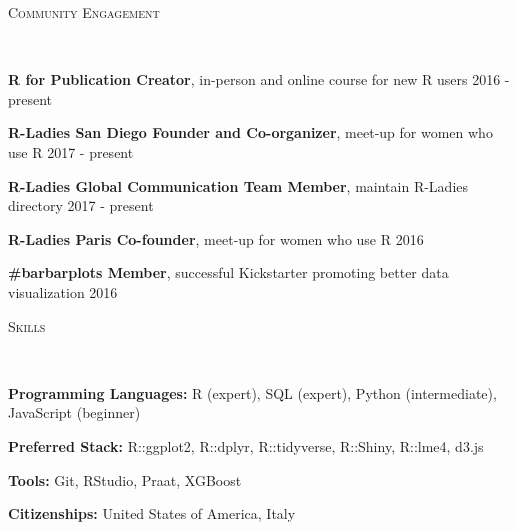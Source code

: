 \documentclass[9pt]{article}
\newenvironment{changemargin}[2]{%
  \begin{list}{}{%
    \setlength{\topsep}{0pt}%
    \setlength{\leftmargin}{#1}%
    \setlength{\rightmargin}{#2}%
    \setlength{\listparindent}{\parindent}%
    \setlength{\itemindent}{\parindent}%
    \setlength{\parsep}{\parskip}%
  }%
  \item[]}{\end{list}
}
\newcommand{\lineover}{
	\begin{changemargin}{-0.05in}{-0.05in}
		\vspace*{-8pt}
		\hrulefill \\
		\vspace*{-2pt}
	\end{changemargin}
}
\newcommand{\header}[1]{
	\begin{changemargin}{-0.5in}{-0.5in}
		\scshape{#1}\\
  	\lineover
	\end{changemargin}
}
\newenvironment{body} {
	\vspace*{-16pt}
	\begin{changemargin}{-0.25in}{-0.5in}
  }	
	{\end{changemargin}
}
\begin{document}
\header{\color{red}Community Engagement}

\begin{body}
	\vspace{14pt}
	
	\textbf{R for Publication Creator}, in-person and online course for new R users \hfill 2016 - present\\
	\medskip
	
	\textbf{R-Ladies San Diego Founder and Co-organizer}, meet-up for women who use R \hfill 2017 - present\\
	\medskip
	
	\textbf{R-Ladies Global Communication Team Member}, maintain R-Ladies directory \hfill 2017 - present\\
	\medskip
	
	\textbf{R-Ladies Paris Co-founder}, meet-up for women who use R \hfill 2016\\
	\medskip

	\textbf{\#barbarplots Member}, successful Kickstarter promoting better data visualization \hfill 2016\\
	\medskip
		
\end{body}

\smallskip

\header{\color{red}Skills}

\begin{body}
	\vspace{14pt}
	
	
	\textbf{Programming Languages:} R (expert), SQL (expert), Python (intermediate), JavaScript (beginner)\
	\medskip

	\textbf{Preferred Stack:} R::ggplot2, R::dplyr, R::tidyverse, R::Shiny, R::lme4, d3.js\\
	\medskip
	
	\textbf{Tools:} Git, RStudio, Praat, XGBoost
	\medskip
	
	\textbf{Citizenships:} United States of America, Italy\\
	\medskip

\end{body}
\end{document}
